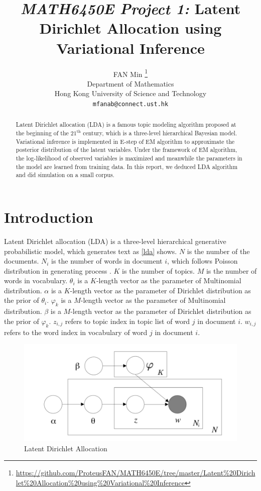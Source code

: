 \documentclass{article}
\title{\emph{MATH6450E Project 1:} Latent Dirichlet Allocation using Variational Inference}
\author{%
  FAN Min
  \thanks{\url{https://github.com/ProteusFAN/MATH6450E/tree/master/Latent\%20Dirichlet\%20Allocation\%20using\%20Variational\%20Inference}} \\
  Department of Mathematics\\
  Hong Kong University of Science and Technology\\
  \texttt{mfanab@connect.ust.hk} \\
}
\begin{document}

\maketitle

\begin{abstract}
   Latent Dirichlet allocation (LDA) is a famous topic modeling algorithm proposed at the beginning of the $ 21^{\mathrm{th}} $ century, which is a three-level hierarchical Bayesian model. Variational inference is implemented in E-step of EM algorithm to approximate the posterior distribution of the latent variables. Under the framework of EM algorithm, the log-likelihood of observed variables is maximized and meanwhile the parameters in the model are learned from training data. In this report, we deduced LDA algorithm and did simulation on a small corpus. 
\end{abstract}

\section{Introduction}

Latent Dirichlet allocation (LDA) is a three-level hierarchical generative probabilistic model, which generates text as \ref{lda} shows. $ N $ is the number of the documents. $ N_{i} $ is the number of words in document $ i $, which follows Poisson distribution in generating process . $ K $ is the number of topics. $ M $ is the number of words in vocabulary. $ \theta_{i} $ is a $ K $-length vector as the parameter of Multinomial distribution. $ \alpha $ is a $ K $-length vector as the parameter of Dirichlet distribution as the prior of $ \theta_{i} $. $ \varphi_{k} $ is a $ M $-length vector as the parameter of Multinomial distribution. $ \beta $ is a $ M $-length vector as the parameter of Dirichlet distribution as the prior of $ \varphi_{k} $. $ z_{i,j} $ refers to topic index in topic list of word $ j $ in document $ i $. $ w_{i,j} $ refers to the word index in vocabulary of word $ j $ in document $ i $.

\begin{figure}[htbp]
	\centering
	\includegraphics[width = 0.7\linewidth]{lda}
	\caption{Latent Dirichlet Allocation}
	\label{figure_lda}
\end{figure}
\end{document}
